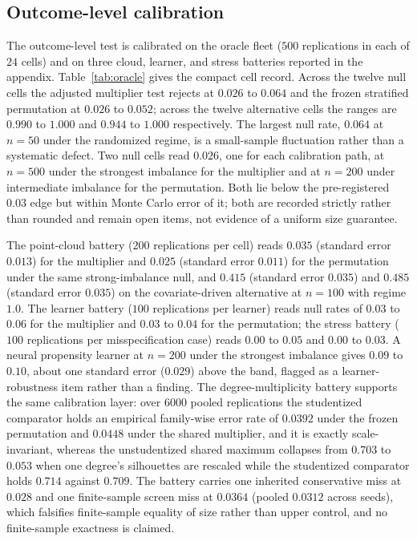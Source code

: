 \subsection{Outcome-level calibration}
\label{sec:exp:calibration}

The outcome-level test is calibrated on the oracle fleet ($500$ replications in each of $24$ cells) and on three cloud, learner, and stress batteries reported in the appendix. Table~\ref{tab:oracle} gives the compact cell record. Across the twelve null cells the adjusted multiplier test rejects at $0.026$ to $0.064$ and the frozen stratified permutation at $0.026$ to $0.052$; across the twelve alternative cells the ranges are $0.990$ to $1.000$ and $0.944$ to $1.000$ respectively. The largest null rate, $0.064$ at $n=50$ under the randomized regime, is a small-sample fluctuation rather than a systematic defect. Two null cells read $0.026$, one for each calibration path, at $n=500$ under the strongest imbalance for the multiplier and at $n=200$ under intermediate imbalance for the permutation. Both lie below the pre-registered $0.03$ edge but within Monte Carlo error of it; both are recorded strictly rather than rounded and remain open items, not evidence of a uniform size guarantee.

The point-cloud battery ($200$ replications per cell) reads $0.035$ (standard error $0.013$) for the multiplier and $0.025$ (standard error $0.011$) for the permutation under the same strong-imbalance null, and $0.415$ (standard error $0.035$) and $0.485$ (standard error $0.035$) on the covariate-driven alternative at $n=100$ with regime $1.0$. The learner battery ($100$ replications per learner) reads null rates of $0.03$ to $0.06$ for the multiplier and $0.03$ to $0.04$ for the permutation; the stress battery ($100$ replications per misspecification case) reads $0.00$ to $0.05$ and $0.00$ to $0.03$. A neural propensity learner at $n=200$ under the strongest imbalance gives $0.09$ to $0.10$, about one standard error ($0.029$) above the band, flagged as a learner-robustness item rather than a finding. The degree-multiplicity battery supports the same calibration layer: over $6000$ pooled replications the studentized comparator holds an empirical family-wise error rate of $0.0392$ under the frozen permutation and $0.0448$ under the shared multiplier, and it is exactly scale-invariant, whereas the unstudentized shared maximum collapses from $0.703$ to $0.053$ when one degree's silhouettes are rescaled while the studentized comparator holds $0.714$ against $0.709$. The battery carries one inherited conservative miss at $0.028$ and one finite-sample screen miss at $0.0364$ (pooled $0.0312$ across seeds), which falsifies finite-sample equality of size rather than upper control, and no finite-sample exactness is claimed.


